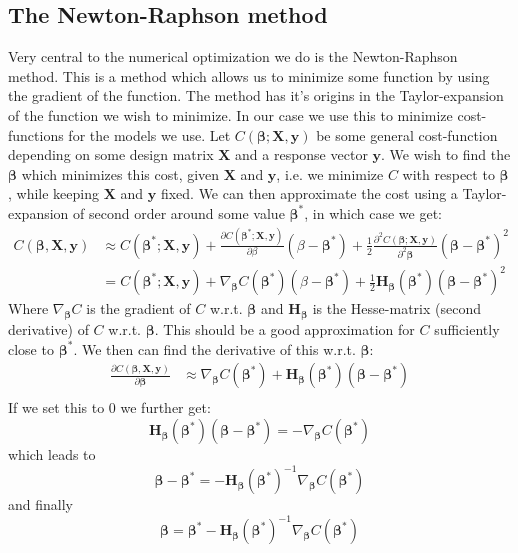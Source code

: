 \documentclass{article}
\begin{document}
\subsection{The Newton-Raphson method}
Very central to the numerical optimization we do is the Newton-Raphson method.
This is a method which allows us to minimize some function by using the gradient
of the function. The method has it's origins in the Taylor-expansion of the
function we wish to minimize. In our case we use this to minimize cost-functions
for the models we use. Let $C(\bm{\beta}; \bm{X}, \bm{y})$ be some general
cost-function depending on some design matrix $\bm{X}$ and a response vector
$\bm{y}$. We wish to find the $\bm{\beta}$ which minimizes this cost, given
$\bm{X}$ and $\bm{y}$, i.e. we minimize $C$ with respect to $\bm{\beta}$, while
keeping $\bm{X}$ and $\bm{y}$ fixed. We can then approximate the cost using a
Taylor-expansion of second order around some value $\bm{\beta}^*$, in which case
we get:
\begin{align*}
    C(\bm{\beta}, \bm{X}, \bm{y}) & \approx C(\bm{\beta}^*; \bm{X}, \bm{y}) + \frac{\partial C(\bm{\beta}^*; \bm{X}, \bm{y})}{\partial \beta}(\beta - \bm{\beta}^*) + \frac{1}{2} \frac{\partial^2 C(\bm{\beta}; \bm{X}, \bm{y})}{\partial^2 \bm{\beta}}(\bm{\beta} - \bm{\beta}^*)^2 \\
                                  & = C(\bm{\beta}^*; \bm{X}, \bm{y}) + \nabla_{\bm{\beta}} C(\bm{\beta}^*) (\beta - \bm{\beta}^*) + \frac{1}{2} \bm{H}_{\bm{\beta}}(\bm{\beta}^*) (\bm{\beta} - \bm{\beta}^*)^2
\end{align*}
Where $\nabla_{\bm{\beta}} C$ is the gradient of $C$ w.r.t. $\bm{\beta}$ and
$\bm{H}_{\bm{\beta}}$ is the Hesse-matrix (second derivative) of $C$ w.r.t.
$\bm{\beta}$. This should be a good approximation for $C$ sufficiently close to
$\bm{\beta}^*$. We then can find the derivative of this w.r.t. $\bm{\beta}$:
\begin{align*}
    \frac{\partial C(\bm{\beta}, \bm{X}, \bm{y})}{\partial \bm{\beta}} & \approx
    \nabla_{\bm{\beta}} C(\bm{\beta}^*) + \bm{H}_{\bm{\beta}}(\bm{\beta}^*)(\bm{\beta} - \bm{\beta}^*) \\
\end{align*}
If we set this to $0$ we further get:
$$\bm{H}_{\bm{\beta}}(\bm{\beta}^*) (\bm{\beta} - \bm{\beta}^*) = -\nabla_{\bm{\beta}} C(\bm{\beta}^*)$$
which leads to
$$\bm{\beta} - \bm{\beta}^* = - \bm{H}_{\bm{\beta}}(\bm{\beta}^*)^{-1} \nabla_{\bm{\beta}} C(\bm{\beta}^*)$$
and finally
$$\bm{\beta} = \bm{\beta}^* - \bm{H}_{\bm{\beta}}(\bm{\beta}^*)^{-1} \nabla_{\bm{\beta}} C(\bm{\beta}^*)$$
\end{document}
